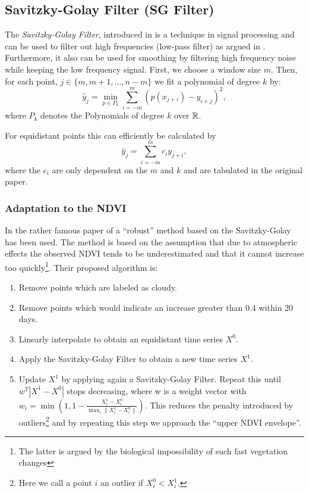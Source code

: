 	\subsection{Savitzky-Golay Filter (SG Filter)}
		\label{sec:Savitzky–Golay}
		The \textit{Savitzky-Golay Filter}, introduced in \cite{savitzkySmoothingDifferentiationData1964} is a technique in signal processing and can be used to filter out high frequencies (low-pass filter) as argued in \cite{schaferWhatSavitzkyGolayFilter2011}. Furthermore, it also can be used for smoothing by filtering high frequency noise while keeping the low frequency signal.
		First, we choose a window size $m$. Then, for each point, $j \in \{m, m+1, \dots, n-m\}$ we fit a polynomial of degree $k$ by:
		$$\hat y_j=\min_{p\in P_k}\sum_{i=-m}^{m}(p (x_{j+i})-y_{i+j})^{2},$$
		where $P_k$ denotes the Polynomials of degree $k$ over $\mathbb{R}$.

		For equidistant points this can efficiently be calculated by
		$$
			\hat y_{j}=\sum_{i=-m}^{m} c_{i} y_{j+i},
		$$
		where the $c_i$ are only dependent on the $m$ and $k$ and are tabulated in the original paper.

		\subsubsection*{Adaptation to the NDVI}
			In the rather famous paper of \cite{chenSimpleMethodReconstructing2004a} a ``robust'' method based on the Savitzky-Golay has been used.
			The method is based on the assumption that due to atmospheric effects the observed NDVI tends to be underestimated and that it cannot increase too quickly\footnote{The latter is argued by the biological impossibility of such fast vegetation changes}. Their proposed algorithm is:
			\begin{enumerate}
				\item Remove points which are labeled as cloudy.
				\item Remove points which would indicate an increase greater than 0.4 within 20 days.
				\item Linearly interpolate to obtain an equidistant time series $X^0$.
				\item Apply the Savitzky-Golay Filter to obtain a new time series $X^1$.
				\item Update $X^1$ by applying again a Savitzky-Golay Filter. Repeat this until $w^T |X^1-X^0|$ stops decreasing, where w is a weight vector with $w_i = \min\left(1, 1 - \frac{X^1_i-X^0_i}{\max_i\|X^1_i-X^0_i\|}\right)$. This reduces the penalty introduced by outliers\footnote{Here we call a point $i$ an outlier if $X^0_i<X^1_i$.} and by repeating this step we approach the ``upper NDVI envelope''.
			\end{enumerate}

